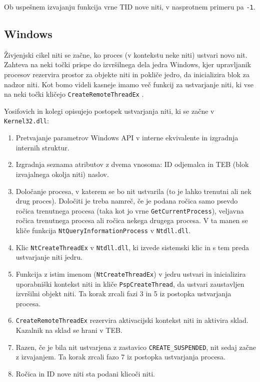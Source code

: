 \documentclass[a4paper,12pt,openright]{book}
\begin{document}
Ob uspešnem izvajanju funkcija vrne TID nove niti, v nasprotnem primeru pa \texttt{-1}.

\subsection{Windows}

Živjenjski cikel niti se začne, ko proces (v kontekstu neke niti) ustvari novo nit.
Zahteva na neki točki prispe do izvršilnega dela jedra Windows, kjer upravljanik procesov rezervira prostor za objekte niti in pokliče jedro, da inicializira blok za nadzor niti.
Kot bomo videli kasneje imamo več funkcij za ustvarjanje niti, ki vse na neki točki kličejo \texttt{CreateRemoteThreadEx} \cite{Yosifovich_Russinovich_Solomon_Ionescu_2017}.

Yosifovich in kolegi \cite{Yosifovich_Russinovich_Solomon_Ionescu_2017} opisujejo postopek ustvarjanja niti, ki se začne v \texttt{Kernel32.dll}:
\begin{enumerate}
	\item Pretvajanje parametrov Windows API v interne ekvivalente in izgradnja internih struktur.
	\item Izgradnja seznama atributov z dvema vnosoma: ID odjemalca in TEB (blok izvajalnega okolja niti) naslov.
	\item Določanje procesa, v katerem se bo nit ustvarila (to je lahko trenutni ali nek drug proces). 
	      Določiti je treba namreč, če je podana ročica samo psevdo ročica trenutnega procesa (taka kot jo vrne \texttt{GetCurrentProcess}), veljavna ročica trenutnega procesa ali ročica nekega drugega procesa.
	      V ta manen se kliče funkcija \texttt{NtQueryInformationProcess} v \texttt{Ntdll.dll}.
	\item Klic \texttt{NtCreateThreadEx} v \texttt{Ntdll.dll}, ki izvede sistemski klic in s tem preda ustvarjanje niti jedru.
	\item Funkcija z istim imenom (\texttt{NtCreateThreadEx}) v jedru ustvari in inicializira uporabniški kontekst niti in kliče \texttt{PspCreateThread}, da ustvari zaustavljen izvršilni objekt niti.
	      Ta korak zrcali fazi 3 in 5 iz postopka ustvarjanja procesa.
	\item \texttt{CreateRemoteThreadEx} rezervira aktivacijski kontekst niti in aktivira sklad.
	      Kazalnik na sklad se hrani v TEB.
	\item Razen, če je bila nit ustvarjena z zastavico \texttt{CREATE\_SUSPENDED}, nit sedaj začne z izvajanjem.
	      Ta korak zrcali fazo 7 iz postopka ustvarjanja procesa.
	\item Ročica in ID nove niti sta podani klicoči niti.
\end{enumerate}
\end{document}
